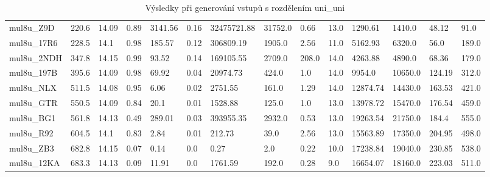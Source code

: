 \begin{landscape}
\begin{table}[!ht]
{\begin{tabular}{|l|l|l|l|l|l|l|l|l|l|l|l|l|l|}
        mul8u\_Z9D & 220.6 & 14.09 & 0.89 & 3141.56 & 0.16 & 32475721.88 & 31752.0 & 0.66 & 13.0 & 1290.61 & 1410.0 & 48.12 & 91.0 \\ 
        mul8u\_17R6 & 228.5 & 14.1 & 0.98 & 185.57 & 0.12 & 306809.19 & 1905.0 & 2.56 & 11.0 & 5162.93 & 6320.0 & 56.0 & 189.0 \\ 
        mul8u\_2NDH & 347.8 & 14.15 & 0.99 & 93.52 & 0.14 & 169105.55 & 2709.0 & 208.0 & 14.0 & 4263.88 & 4890.0 & 68.36 & 179.0 \\ 
        mul8u\_197B & 395.6 & 14.09 & 0.98 & 69.92 & 0.04 & 20974.73 & 424.0 & 1.0 & 14.0 & 9954.0 & 10650.0 & 124.19 & 312.0 \\ 
        mul8u\_NLX & 511.5 & 14.08 & 0.95 & 6.06 & 0.02 & 2751.55 & 161.0 & 1.29 & 14.0 & 12874.74 & 14430.0 & 163.53 & 421.0 \\ 
        mul8u\_GTR & 550.5 & 14.09 & 0.84 & 20.1 & 0.01 & 1528.88 & 125.0 & 1.0 & 13.0 & 13978.72 & 15470.0 & 176.54 & 459.0 \\ 
        mul8u\_BG1 & 561.8 & 14.13 & 0.49 & 289.01 & 0.03 & 393955.35 & 2932.0 & 0.53 & 13.0 & 19263.54 & 21750.0 & 184.4 & 555.0 \\ 
        mul8u\_R92 & 604.5 & 14.1 & 0.83 & 2.84 & 0.01 & 212.73 & 39.0 & 2.56 & 13.0 & 15563.89 & 17350.0 & 204.95 & 498.0 \\ 
        mul8u\_ZB3 & 682.8 & 14.15 & 0.07 & 0.14 & 0.0 & 0.27 & 2.0 & 0.22 & 10.0 & 17238.84 & 19040.0 & 230.85 & 538.0 \\ 
        mul8u\_12KA & 683.3 & 14.13 & 0.09 & 11.91 & 0.0 & 1761.59 & 192.0 & 0.28 & 9.0 & 16654.07 & 18160.0 & 223.03 & 511.0 \\ 
    \end{tabular}}
    \caption{Výsledky při generování vstupů s rozdělením uni\_uni}
    \label{uni_uni}
\end{table}


\end{landscape}
